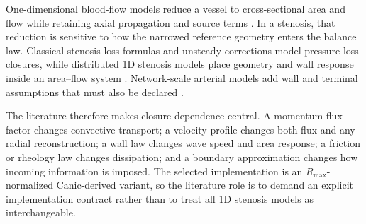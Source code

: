 One-dimensional blood-flow models reduce a vessel to cross-sectional area and
flow while retaining axial propagation and source terms
\cite{FormaggiaEtAl2003OneDimensionalBloodFlow,QuarteroniFormaggia2004CardiovascularModeling,ShiEtAl2011BloodFlowModelReview}. In a stenosis, that reduction is
sensitive to how the narrowed reference geometry enters the balance law.
Classical stenosis-loss formulas and unsteady corrections model pressure-loss
closures, while distributed 1D stenosis models place geometry and wall response
inside an area--flow system
\cite{YoungTsai1973SteadyStenosis,YoungTsai1973UnsteadyStenosis,LyrasLee2021PressureDropROM,CanicEtAl2024Extended1DStenosis}. Network-scale arterial models add
wall and terminal assumptions that must also be declared
\cite{DuanmuEtAl2019CoronaryArterialTree,Wang2014BloodFlowNetworks}.

The literature therefore makes closure dependence central. A momentum-flux factor
changes convective transport; a velocity profile changes both flux and any
radial reconstruction; a wall law changes wave speed and area response; a
friction or rheology law changes dissipation; and a boundary approximation
changes how incoming information is imposed. The selected implementation is an
$R_{\max}$-normalized Canic-derived variant, so the literature role is to demand
an explicit implementation contract rather than to treat all 1D stenosis models
as interchangeable.

